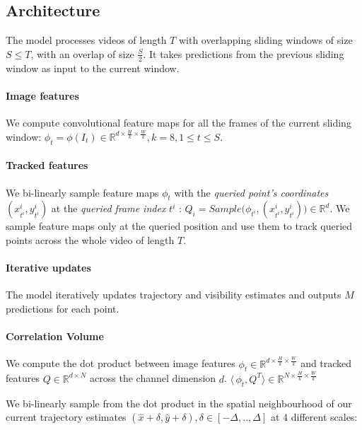 \subsection{Architecture}\label{sec:architecture}

The model processes videos of length $T$ with overlapping sliding windows of size $S\leq T$, with an overlap of size $\frac{S}{2}$. It takes predictions from the previous sliding window as input to the current window. 

\paragraph{Image features}
We compute convolutional feature maps for all the frames of the current sliding window: $\phi_t = \phi(I_t) \in \mathbb{R}^{d\times \frac{H}{k} \times \frac{W}{k}}, k=8,  1 \leq t \leq S$.

\paragraph{Tracked features}
We bi-linearly sample feature maps $\phi_t$ with the \textit{queried point's coordinates} $(x_{t^i}^i, y_{t^i}^i)$ at the \textit{queried frame index} $t^i$ : $Q_i  = Sample\big (\phi_{t^i}, (x_{t^i}^i, y_{t^i}^i)\big ) \in \mathbb{R}^d$.  We sample feature maps only at the queried position and use them to track queried points across the whole video of length $T$. 


\paragraph{Iterative updates}
The model iteratively updates trajectory and visibility estimates and outputs $M$ predictions for each point. 

\paragraph{Correlation Volume}
We compute the dot product between image features $\phi_t \in  \mathbb{R}^{d \times \frac{H}{k} \times \frac{W}{k}}$ and tracked features $Q \in  \mathbb{R}^{d \times N}$ across the channel dimension $d$.
$\langle\,\phi_t, Q^T \rangle \in  \mathbb{R}^{N \times \frac{H}{k} \times \frac{W}{k}}$

We bi-linearly sample from the dot product in the spatial neighbourhood of our current trajectory estimates $(\hat x + \delta, \hat y + \delta), \delta \in [-\Delta,.., \Delta]$ at 4 different scales:

